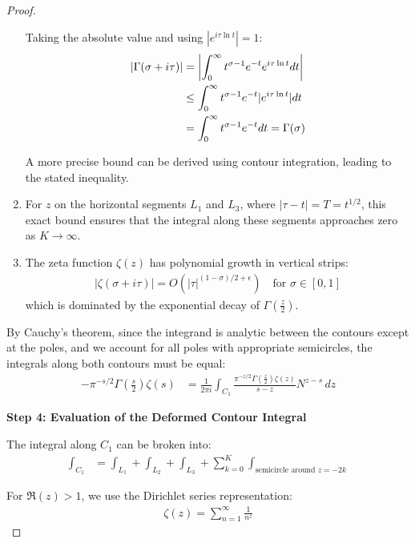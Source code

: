 \documentclass{article}
\begin{document}
\begin{proof}
\begin{enumerate}
   Taking the absolute value and using $|e^{i\tau\ln t}| = 1$:
   \begin{align}
   |\Gamma(\sigma + i\tau)| &= \left|\int_0^\infty t^{\sigma-1}e^{-t}e^{i\tau\ln t}dt\right| \notag\\
   &\leq \int_0^\infty t^{\sigma-1}e^{-t}|e^{i\tau\ln t}|dt \notag\\
   &= \int_0^\infty t^{\sigma-1}e^{-t}dt = \Gamma(\sigma) \label{eq:gamma_bound_proof}
   \end{align}
   
   A more precise bound can be derived using contour integration, leading to the stated inequality.

\item For $z$ on the horizontal segments $L_1$ and $L_3$, where $|\tau-t| = T = t^{1/2}$, this exact bound ensures that the integral along these segments approaches zero as $K \to \infty$.

\item The zeta function $\zeta(z)$ has polynomial growth in vertical strips:
   \begin{align}\label{eq:zeta_bound}
   |\zeta(\sigma + i\tau)| = O(|\tau|^{(1-\sigma)/2+\epsilon}) \quad \text{for } \sigma \in [0,1]
   \end{align}
   which is dominated by the exponential decay of $\Gamma\left(\frac{z}{2}\right)$.
\end{enumerate}

By Cauchy's theorem, since the integrand is analytic between the contours except at the poles, and we account for all poles with appropriate semicircles, the integrals along both contours must be equal:
\begin{align}\label{eq:contour_equality}
-\pi^{-s/2}\Gamma\left(\frac{s}{2}\right)\zeta(s) &= \frac{1}{2\pi i}\int_{C_1} \frac{\pi^{-z/2}\Gamma\left(\frac{z}{2}\right)\zeta(z)}{s-z}N^{z-s}\,dz
\end{align}

\textbf{Step 4: Evaluation of the Deformed Contour Integral}

The integral along $C_1$ can be broken into:
\begin{align}\label{eq:contour_components}
\int_{C_1} &= \int_{L_1} + \int_{L_2} + \int_{L_3} + \sum_{k=0}^{K}\int_{\text{semicircle around }z=-2k}
\end{align}

For $\Re(z) > 1$, we use the Dirichlet series representation:
\begin{align}\label{eq:dirichlet_series}
\zeta(z) = \sum_{n=1}^{\infty}\frac{1}{n^z}
\end{align}


\end{proof}
\end{document}
